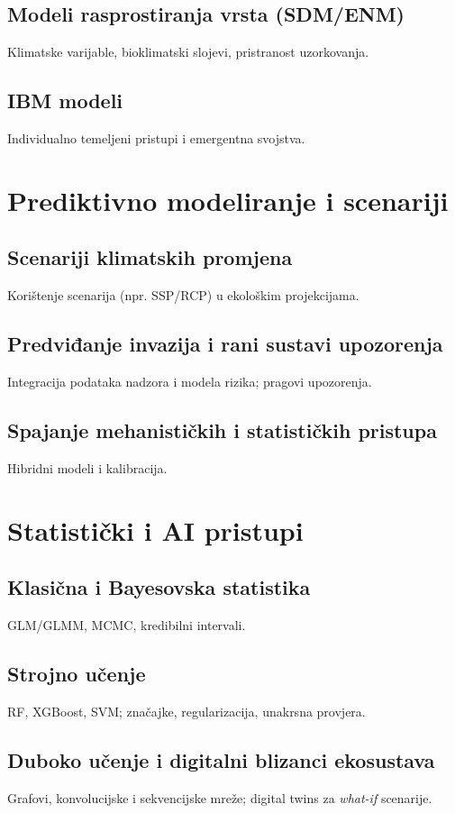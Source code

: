 \documentclass[12pt,oneside]{book}
\begin{document}
	\section{Modeli rasprostiranja vrsta (SDM/ENM)}
	Klimatske varijable, bioklimatski slojevi, pristranost uzorkovanja.
	\section{IBM modeli}
	Individualno temeljeni pristupi i emergentna svojstva.
	
	\chapter{Prediktivno modeliranje i scenariji}
	\section{Scenariji klimatskih promjena}
	Korištenje scenarija (npr. SSP/RCP) u ekološkim projekcijama.
	\section{Predviđanje invazija i rani sustavi upozorenja}
	Integracija podataka nadzora i modela rizika; pragovi upozorenja.
	\section{Spajanje mehanističkih i statističkih pristupa}
	Hibridni modeli i kalibracija.
	
	\chapter{Statistički i AI pristupi}
	\section{Klasična i Bayesovska statistika}
	GLM/GLMM, MCMC, kredibilni intervali.
	\section{Strojno učenje}
	RF, XGBoost, SVM; značajke, regularizacija, unakrsna provjera.
	\section{Duboko učenje i digitalni blizanci ekosustava}
	Grafovi, konvolucijske i sekvencijske mreže; digital twins za \emph{what-if} scenarije.
	
\end{document}

